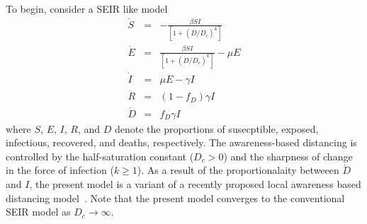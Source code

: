 To begin, consider a SEIR like model
\begin{eqnarray}
\dot{S} &=& -\frac{\beta SI}{\left[1+\left(\dot{D}/D_c\right)^{k}\right]}\\
\dot{E} &=& \frac{\beta SI}{\left[1+\left(\dot{D}/D_c\right)^{k}\right]}-\mu E\\
\dot{I} &=& \mu E-\gamma I \\
\dot{R} &=& (1-f_D)\gamma I\\
\dot{D} &=& f_D\gamma I
\end{eqnarray}
where $S$, $E$, $I$, $R$, and $D$ denote the proportions of
susecptible, exposed, infectious, recovered, and deaths, respectively.
The awareness-based distancing is controlled by 
the half-saturation constant ($D_c>0$) and
the sharpness of change in the force of infection ($k\geq 1$).
As a result of the proportionalaity
betweeen $\dot{D}$ and $I$, the present model is a variant of a recently proposed
local awareness based distancing model~\citep{eksin2019systematic}.
Note that the present
model converges to the conventional SEIR model as $D_c\rightarrow \infty$.
